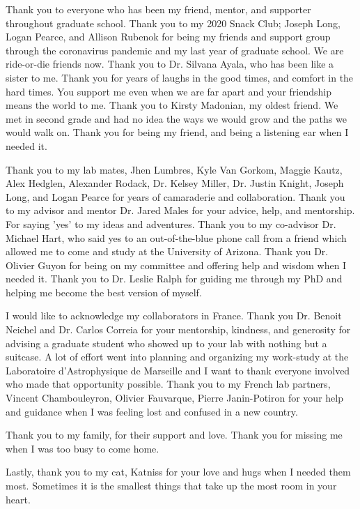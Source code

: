 
Thank you to everyone who has been my friend, mentor, and supporter throughout graduate school. Thank you to my 2020 Snack Club; Joseph Long, Logan Pearce, and Allison Rubenok for being my friends and support group through the coronavirus pandemic and my last year of graduate school. We are ride-or-die friends now. Thank you to Dr. Silvana Ayala, who has been like a sister to me. Thank you for years of laughs in the good times, and comfort in the hard times. You support me even when we are far apart and your friendship means the world to me. Thank you to Kirsty Madonian, my oldest friend. We met in second grade and had no idea the ways we would grow and the paths we would walk on. Thank you for being my friend, and being a listening ear when I needed it.  

Thank you to my lab mates, Jhen Lumbres, Kyle Van Gorkom, Maggie Kautz, Alex Hedglen, Alexander Rodack, Dr. Kelsey Miller, Dr. Justin Knight, Joseph Long, and Logan Pearce for years of camaraderie and collaboration. Thank you to my advisor and mentor Dr. Jared Males for your advice, help, and mentorship. For saying 'yes' to my ideas and adventures. Thank you to my co-advisor Dr. Michael Hart, who said yes to an out-of-the-blue phone call from a friend which allowed me to come and study at the University of Arizona. Thank you Dr. Olivier Guyon for being on my committee and offering help and wisdom when I needed it. Thank you to Dr. Leslie Ralph for guiding me through my PhD and helping me become the best version of myself. 

I would like to acknowledge my collaborators in France. Thank you Dr. Benoit Neichel and Dr. Carlos Correia for your mentorship, kindness, and generosity for advising a graduate student who showed up to your lab with nothing but a suitcase. A lot of effort went into planning and organizing my work-study at the Laboratoire d'Astrophysique de Marseille and I want to thank everyone involved who made that opportunity possible. Thank you to my French lab partners, Vincent Chambouleyron, Olivier Fauvarque, Pierre Janin-Potiron for your help and guidance when I was feeling lost and confused in a new country. 

Thank you to my family, for their support and love. Thank you for missing me when I was too busy to come home.

Lastly, thank you to my cat, Katniss for your love and hugs when I needed them most. Sometimes it is the smallest things that take up the most room in your heart. 

